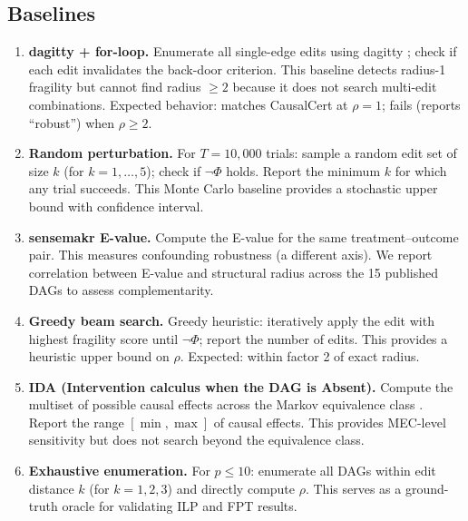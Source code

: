\documentclass[11pt,a4paper]{article}
\theoremstyle{definition}
\theoremstyle{remark}
\newcommand{\radius}{\rho}
\newcommand{\Phi}{\varPhi}
\begin{document}
\subsection{Baselines}\label{sec:baselines}

\begin{enumerate}[label=\textbf{B\arabic*:}]
\item \textbf{dagitty + for-loop.} Enumerate all single-edge edits using dagitty
  \cite{textor2016}; check if each edit invalidates the back-door criterion. This
  baseline detects radius-1 fragility but cannot find radius $\geq 2$ because it does
  not search multi-edit combinations. Expected behavior: matches CausalCert at $\radius = 1$;
  fails (reports ``robust'') when $\radius \geq 2$.

\item \textbf{Random perturbation.} For $T = 10{,}000$ trials: sample a random edit set
  of size $k$ (for $k = 1, \ldots, 5$); check if $\neg\Phi$ holds. Report the minimum
  $k$ for which any trial succeeds. This Monte Carlo baseline provides a stochastic
  upper bound with confidence interval.

\item \textbf{sensemakr E-value.} Compute the E-value \cite{vanderweele2017} for the
  same treatment--outcome pair. This measures confounding robustness (a different axis).
  We report correlation between E-value and structural radius across the 15 published
  DAGs to assess complementarity.

\item \textbf{Greedy beam search.} Greedy heuristic: iteratively apply the edit with
  highest fragility score until $\neg\Phi$; report the number of edits. This provides
  a heuristic upper bound on $\radius$. Expected: within factor 2 of exact radius.

\item \textbf{IDA (Intervention calculus when the DAG is Absent).} Compute the
  multiset of possible causal effects across the Markov equivalence class
  \cite{maathuis2009}. Report the range $[\min, \max]$ of causal effects. This provides
  MEC-level sensitivity but does not search beyond the equivalence class.

\item \textbf{Exhaustive enumeration.} For $p \leq 10$: enumerate all DAGs within
  edit distance $k$ (for $k = 1, 2, 3$) and directly compute $\radius$. This serves
  as a ground-truth oracle for validating ILP and FPT results.
\end{enumerate}
\end{document}
